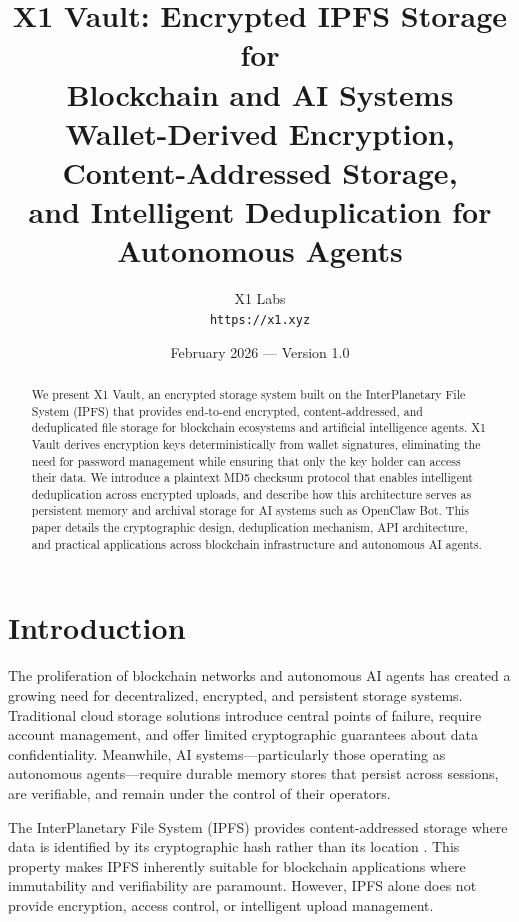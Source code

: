 \documentclass[11pt,a4paper]{article}
\title{
    \vspace{-1cm}
    {\Large\textbf{X1 Vault: Encrypted IPFS Storage for\\Blockchain and AI Systems}}\\[0.5em]
    {\large Wallet-Derived Encryption, Content-Addressed Storage,\\and Intelligent Deduplication for Autonomous Agents}
}
\author{
    X1 Labs\\
    \texttt{https://x1.xyz}
}
\date{February 2026 --- Version 1.0}
\begin{document}
\maketitle
\thispagestyle{fancy}

\begin{abstract}
We present X1 Vault, an encrypted storage system built on the InterPlanetary File System (IPFS) that provides end-to-end encrypted, content-addressed, and deduplicated file storage for blockchain ecosystems and artificial intelligence agents. X1 Vault derives encryption keys deterministically from wallet signatures, eliminating the need for password management while ensuring that only the key holder can access their data. We introduce a plaintext MD5 checksum protocol that enables intelligent deduplication across encrypted uploads, and describe how this architecture serves as persistent memory and archival storage for AI systems such as OpenClaw Bot. This paper details the cryptographic design, deduplication mechanism, API architecture, and practical applications across blockchain infrastructure and autonomous AI agents.
\end{abstract}

\tableofcontents
\newpage

\section{Introduction}

The proliferation of blockchain networks and autonomous AI agents has created a growing need for decentralized, encrypted, and persistent storage systems. Traditional cloud storage solutions introduce central points of failure, require account management, and offer limited cryptographic guarantees about data confidentiality. Meanwhile, AI systems---particularly those operating as autonomous agents---require durable memory stores that persist across sessions, are verifiable, and remain under the control of their operators.

The InterPlanetary File System (IPFS) provides content-addressed storage where data is identified by its cryptographic hash rather than its location \cite{benet2014ipfs}. This property makes IPFS inherently suitable for blockchain applications where immutability and verifiability are paramount. However, IPFS alone does not provide encryption, access control, or intelligent upload management.
\end{document}
